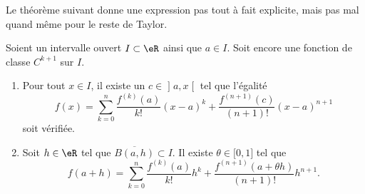 Le théorème suivant donne une expression pas tout à fait explicite, mais pas mal quand même pour le reste de Taylor.
\begin{theorem}     \label{THOooSIGRooJTLvlV}
	Soient un intervalle ouvert \( I\subset \eR\) ainsi que \( a\in I\). Soit encore une fonction de classe \( C^{k+1}\) sur \( I\).

	\begin{enumerate}
		\item
		      Pour tout \( x\in I\), il existe un \( c\in \mathopen] a , x \mathclose[\) tel que l'égalité
		      \begin{equation}        \label{EQooQFMFooBVpGzy}
			      f(x)=\sum_{k=0}^n\frac{ f^{(k)}(a) }{k!}(x-a)^k+\frac{ f^{(n+1)}(c) }{ (n+1)! }(x-a)^{n+1}
		      \end{equation}
		      soit vérifiée.
		\item       \label{ITEMooVGBVooGXXvIz}
		      Soit \( h\in \eR\) tel que \( \overline{ B(a,h) }\subset I\). Il existe \( \theta\in \mathopen[ 0 , 1 \mathclose]\) tel que
		      \begin{equation}
			      f(a+h)=\sum_{k=0}^n\frac{ f^{(k)}(a) }{ k! }h^k+\frac{ f^{(n+1)}(a+\theta h) }{ (n+1)! }h^{n+1}.
		      \end{equation}
	\end{enumerate}
\end{theorem}

